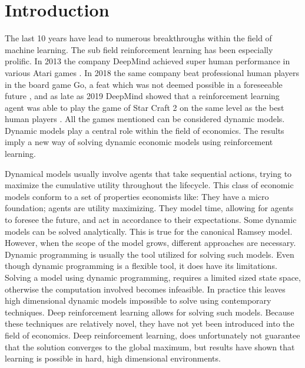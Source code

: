\section{Introduction} 

The last 10 years have lead to numerous breakthroughs within the field of machine learning. The sub field reinforcement learning has been especially prolific. In 2013 the company DeepMind achieved super human performance in various Atari games \parencite{mnih_playing_2013}. In 2018 the same company beat professional human players in the board game Go, a feat which was not deemed possible in a foreseeable future \parencite{silver_general_2018}, and as late as 2019 DeepMind showed that a reinforcement learning agent was able to play the game of Star Craft 2 on the same level as the best human players \parencite{vinyals_grandmaster_2019}. All the games mentioned can be considered dynamic models. Dynamic models play a central role within the field of economics. The results imply a new way of solving dynamic economic models using reinforcement learning.

Dynamical models usually involve agents that take sequential actions, trying to maximize the cumulative utility throughout the lifecycle. This class of economic models conform to a set of properties economists like: They have a micro foundation; agents are utility maximizing. They model time, allowing for agents to foresee the future, and act in accordance to their expectations. Some dynamic models can be solved  analytically. This is true for the canonical Ramsey model. However, when the scope of the model grows, different approaches are necessary. Dynamic programming is usually the tool utilized for solving such models.  Even though dynamic programming is a flexible tool, it does have its limitations. Solving a model using dynamic programming, requires a limited sized state space, otherwise the computation involved becomes infeasible. In practice this leaves high dimensional dynamic models impossible to solve using contemporary techniques. Deep reinforcement learning allows for solving such models. Because these techniques are relatively novel, they have not yet been introduced into the field of economics. Deep reinforcement learning, does unfortunately not guarantee that the solution converges to the global maximum, but results have shown that learning is possible in hard, high dimensional environments.

